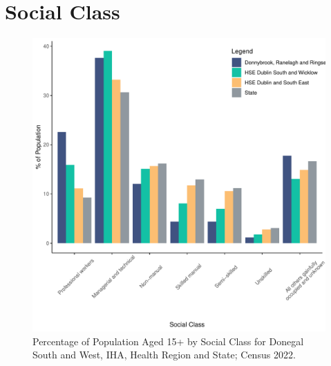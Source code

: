 \documentclass{article}
\begin{document}
\section{Social Class}\label{sect:SC}
\begin{figure}[H]
	\centering
	\includegraphics[width = 140mm]{../figures/SocialClassED.pdf}
	\caption{Percentage of Population Aged 15+ by Social Class for Donegal South and West, IHA, Health Region and State; Census 2022.}
	\label{fig:vbnv}
	\end{figure}
\end{document}
